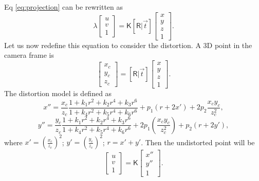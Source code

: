 Eq \eqref{eq:projection} can be rewritten as
\begin{equation}
    \label{eq:dist_start}
    \lambda \begin{bmatrix} 
        u \\ v \\ 1 \end{bmatrix} = \pmb{\mathsf{K}} [\pmb{\mathsf{R}} | \vec{t}] \begin{bmatrix} x \\ y \\ z \\ 1
    \end{bmatrix}.
\end{equation}
Let us now redefine this equation to consider the distortion. A 3D point in the camera frame is 
\begin{equation}
    \label{eq:dist_2}
    \begin{bmatrix} x_c \\ y_c \\ z_c \end{bmatrix}
     = [\pmb{\mathsf{R}} | \vec{t}] \begin{bmatrix} x \\ y \\ z \\ 1
    \end{bmatrix}.
\end{equation}
The distortion model is defined as 
\begin{equation}
    \label{eq:dist_3}
    x'' = \frac{x_c}{z_c} \frac{1 + k_1r^2 + k_2r^4 + k_3r^6}{1 + k_4r^2 + k_5r^4 + k_6r^6} + p_1(r + 2x') + 2p_2\frac{x_c y_c}{z^2_c},
\end{equation}
\begin{equation}
    \label{eq:dist_4}
    y'' = \frac{y_c}{z_c} \frac{1 + k_1r^2 + k_2r^4 + k_3r^6}{1 + k_4r^2 + k_5r^4 + k_6r^6} + 2p_1(\frac{x_c y_c}{z_c^2}) + p_2(r + 2y'),
\end{equation}
where $x' = (\frac{x_c}{z_c})^2$; $y' = (\frac{y_c}{z_c})^2$; $r = x' + y'$. Then the undistorted point will be
\begin{equation}
    \label{eq:dist_end}
    \begin{bmatrix} u \\ v \\ 1 \end{bmatrix} = \pmb{\mathsf{K}} \begin{bmatrix} x'' \\ y'' \\ 1 \end{bmatrix}.
\end{equation}

